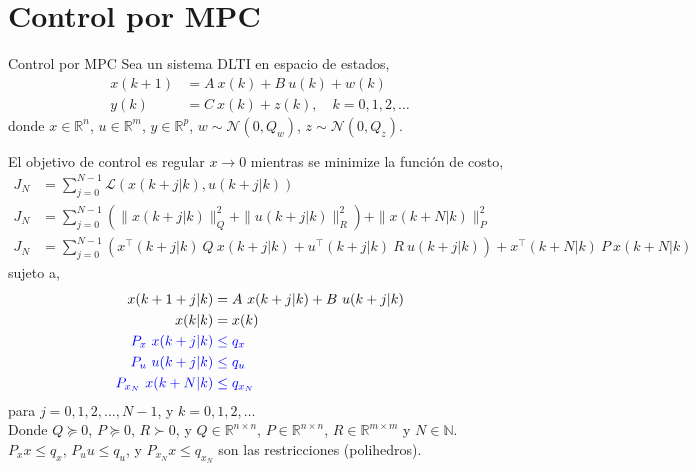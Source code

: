 \documentclass[8pt]{beamer}
\begin{document}
\section{Control por MPC}
\begin{frame}[fragile]{Control por MPC}	
	Sea un sistema DLTI en espacio de estados,
	\begin{equation}
	\begin{aligned}
	x(k+1) & = A~x(k)+B~u(k)+w(k)               \\
	y(k)   & = C~x(k)+z(k), \quad k=0,1,2,\dots
	\end{aligned}
	\end{equation}
	donde $x\in\mathbb{R}^n$, $u\in\mathbb{R}^m$, $y\in\mathbb{R}^p$, $w\sim\mathcal{N}(0,Q_w)$, $z\sim\mathcal{N}(0,Q_z)$. 
	
	El objetivo de control es regular $x\rightarrow 0$ mientras se minimize la función de costo,
	\begin{align}
		J_N & = \sum_{j=0}^{N-1} \mathcal{L}( x(k+j|k), u(k+j|k) )          \nonumber                                                       \\
		J_N & = \sum_{j=0}^{N-1} \left( \|x(k+j|k)\|^2_Q + \|u(k+j|k)\|^2_R \right) + \|x(k+N|k)\|^2_P     \label{eq:MPC}                   \\
		J_N & = \sum_{j=0}^{N-1} (x^\intercal(k+j|k)~Q~x(k+j|k)+ u^\intercal(k+j|k)~R~u(k+j|k) )  + x^\intercal(k+N|k)~P~x(k+N|k) \nonumber
	\end{align}
	\qquad sujeto a, 
	\begin{align*}
		x(k+1+j|k)                   & = A~x(k+j|k)+B~u(k+j|k)  \\
		x(k|k)                       & = x(k)                   \\
		\color{blue}P_x~x(k+j|k)     & \color{blue}\leq q_x     \\
		\color{blue}P_u~u(k+j|k)     & \color{blue}\leq q_u     \\
		\color{blue}P_{x_N}~x(k+N|k) & \color{blue}\leq q_{x_N}
	\end{align*}
	\qquad para $ j=0,1,2,\dots,N-1$, y $k=0,1,2,\dots$\\
	
	Donde $Q\succeq 0$, $P\succeq 0$, $R\succ 0$, y $Q\in\mathbb{R}^{n\times n}$, $P\in\mathbb{R}^{n\times n}$, $R\in\mathbb{R}^{m\times m}$ y $N \in\mathbb{N}$. $P_x x\leq q_x$, $P_u u\leq q_u$, y $P_{x_N} x\leq q_{x_N}$ son las restricciones (polihedros). 
	
\end{frame}
\end{document}
